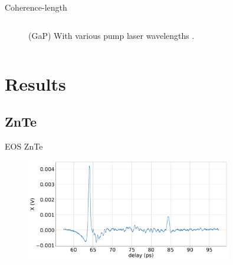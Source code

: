 \documentclass[aspectratio=1610, 9pt]{beamer}
\begin{document}
\begin{frame}{Coherence-length}
\begin{center}
\begin{columns}
\begin{column}{.4\textwidth}
\begin{figure}
      \caption{(GaP) With various pump laser wavelengths \cite{GaP_coherence_length}.}
    \end{figure}
    \end{column}
  \end{columns}
\end{center}
\end{frame}

\section{Results}
\subsection{ZnTe}
\begin{frame}{EOS ZnTe}
\begin{figure}
  \includegraphics[width=0.8\textwidth]{images/2_11_30_20normalX.pdf}
\end{figure}
\end{frame}
\end{document}

